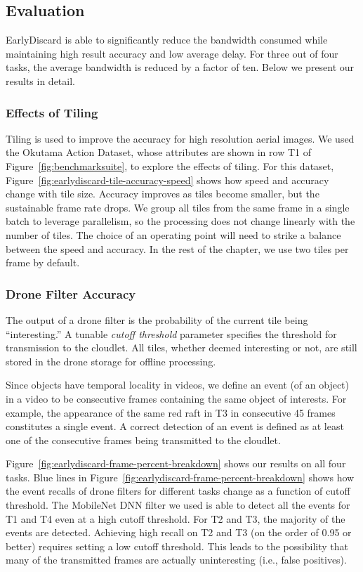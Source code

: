 \subsection{Evaluation}
\label{sec:earlydiscard-result}

EarlyDiscard is able to significantly reduce the bandwidth consumed while
maintaining high result accuracy and low average delay. For three out of four
tasks, the average bandwidth is reduced by a factor of ten. Below we present
our results in detail.

\subsubsection{Effects of Tiling}
Tiling is used to improve the accuracy
for high resolution aerial images. We used the Okutama Action Dataset, whose
attributes are shown in row T1 of Figure~\ref{fig:benchmarksuite}, to explore
the effects of tiling.  For this dataset,
Figure~\ref{fig:earlydiscard-tile-accuracy-speed} shows how speed and accuracy
change with tile size.  Accuracy improves as tiles become smaller, but the
sustainable frame rate drops.  We group all tiles from the same frame in a
single batch to leverage parallelism, so the processing does not change linearly
with the number of tiles. The choice of an operating point will need to strike a
balance between the speed and accuracy.  In the rest of the chapter, we use two
tiles per frame by default. 

\subsubsection{Drone Filter Accuracy}
The output of a drone filter is the
probability of the current tile being ``interesting.''  A tunable {\em cutoff
threshold} parameter specifies the threshold for transmission to the cloudlet.
All tiles, whether deemed interesting or not, are still stored in the drone
storage for offline processing.

Since objects have temporal locality in videos, we define an event (of an
object) in a video to be consecutive frames containing the same object of
interests. For example, the appearance of the same red raft in T3 in consecutive
45 frames constitutes a single event. A correct detection of an event is defined
as at least one of the consecutive frames being transmitted to the cloudlet.  

Figure~\ref{fig:earlydiscard-frame-percent-breakdown} shows our results on all
four tasks. Blue lines in Figure~\ref{fig:earlydiscard-frame-percent-breakdown}
shows how the event recalls of drone filters for different tasks change as a
function of cutoff threshold. The MobileNet DNN filter we used is able to detect
all the events for T1 and T4 even at a high cutoff threshold. For T2 and T3, the
majority of the events are detected. Achieving high recall on T2 and T3 (on the
order of 0.95 or better) requires setting a low cutoff threshold.  This leads to
the possibility that many of the transmitted frames are actually uninteresting
(i.e., false positives).

